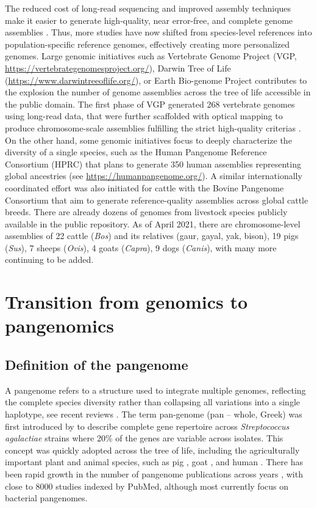 \documentclass[../main.tex]{subfiles}
\begin{document}
The reduced cost of long-read sequencing and improved assembly techniques  make it easier to generate high-quality, near error-free, and complete genome assemblies \citep{miga2020telomere,logsdon2021structure}. Thus, more studies have now shifted from species-level references into population-specific reference genomes, effectively creating more personalized genomes. Large genomic initiatives such as Vertebrate Genome Project (VGP, \url{https://vertebrategenomesproject.org/}), Darwin Tree of Life (\url{https://www.darwintreeoflife.org/}), or Earth Bio-genome Project \citep{lewin2018earth} contributes to the explosion the number of genome assemblies across the tree of life accessible in the public domain. The first phase of VGP generated 268 vertebrate genomes using long-read data, that were further scaffolded with optical mapping to produce chromosome-scale assemblies fulfilling the strict high-quality criterias \citep{Rhie2021}. On the other hand, some genomic initiatives focus to deeply characterize the diversity of a single species, such as the Human Pangenome Reference Consortium (HPRC) that plans to generate 350 human assemblies representing global ancestries (see \url{https://humanpangenome.org/}). A similar internationally coordinated effort was also initiated for cattle with the Bovine Pangenome Consortium \citep{heaton2021reference} that aim to generate reference-quality assemblies across global cattle breeds. There are already dozens of genomes from livestock species publicly available in the public repository. As of April 2021, there are chromosome-level assemblies of 22 cattle (\emph{Bos}) and its relatives (gaur, gayal, yak, bison), 19 pigs (\emph{Sus}), 7 sheeps (\emph{Ovis}), 4 goats (\emph{Capra}), 9 dogs (\emph{Canis}), with many more continuing to be added.

\section{Transition from genomics to pangenomics}

\subsection{Definition of the pangenome}

A pangenome refers to a structure used to  integrate multiple genomes, reflecting the complete species diversity rather than collapsing all variations into a single haplotype, see recent reviews \citep{bayer2020plant,sherman2020pan,della2021pan}. The term pan-genome (pan – whole, Greek) was first introduced by \citet{tettelin2005genome} to describe complete gene repertoire across \emph{Streptococcus agalactiae} strains where 20\% of the genes are variable across isolates. This concept was quickly adopted across the tree of life, including the agriculturally important plant and animal species, such as pig \citep{li2017comprehensive,tian2019building}, goat \citep{li2019towards}, and human \citep{duan2019hupan,sherman2019assembly}. There has been rapid growth in the number of pangenome publications across years \citep{bayer2020plant}, with close to 8000 studies indexed by PubMed,  although most currently focus on bacterial pangenomes.  
\end{document}
